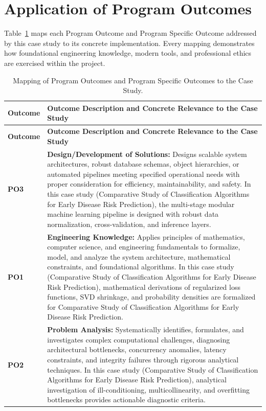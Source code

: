 \section{Application of Program Outcomes}
Table~\ref{tab:po} maps each Program Outcome and Program Specific Outcome addressed by this case study to its concrete implementation. Every mapping demonstrates how foundational engineering knowledge, modern tools, and professional ethics are exercised within the project.

{\small
\begin{longtable}{@{}>{\centering\arraybackslash}p{1.8cm} p{13.2cm}@{}}
    \caption{Mapping of Program Outcomes and Program Specific Outcomes to the Case Study.}\label{tab:po}\\
    \toprule
    \textbf{Outcome} & \textbf{Outcome Description and Concrete Relevance to the Case Study} \\
    \midrule
    \endfirsthead
    \toprule
    \textbf{Outcome} & \textbf{Outcome Description and Concrete Relevance to the Case Study} \\
    \midrule
    \endhead
\textbf{PO3} & \textbf{Design/Development of Solutions:} Designs scalable system architectures, robust database schemas, object hierarchies, or automated pipelines meeting specified operational needs with proper consideration for efficiency, maintainability, and safety. In this case study (Comparative Study of Classification Algorithms for Early Disease Risk Prediction), the multi-stage modular machine learning pipeline is designed with robust data normalization, cross-validation, and inference layers. \\
    \addlinespace
\textbf{PO1} & \textbf{Engineering Knowledge:} Applies principles of mathematics, computer science, and engineering fundamentals to formalize, model, and analyze the system architecture, mathematical constraints, and foundational algorithms. In this case study (Comparative Study of Classification Algorithms for Early Disease Risk Prediction), mathematical derivations of regularized loss functions, SVD shrinkage, and probability densities are formalized for Comparative Study of Classification Algorithms for Early Disease Risk Prediction. \\
    \addlinespace
\textbf{PO2} & \textbf{Problem Analysis:} Systematically identifies, formulates, and investigates complex computational challenges, diagnosing architectural bottlenecks, concurrency anomalies, latency constraints, and integrity failures through rigorous analytical techniques. In this case study (Comparative Study of Classification Algorithms for Early Disease Risk Prediction), analytical investigation of ill-conditioning, multicollinearity, and overfitting bottlenecks provides actionable diagnostic criteria. \\

\end{longtable}}
